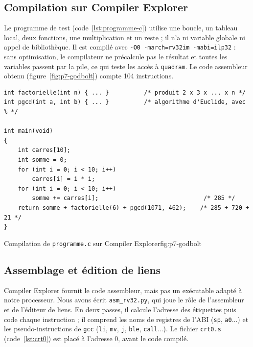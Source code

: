 \subsection{Compilation sur Compiler Explorer}

Le programme de test (code~\ref{lst:programme-c}) utilise une boucle, un tableau local, deux
fonctions, une multiplication et un reste ; il n'a ni variable globale ni appel de
bibliothèque. Il est compilé avec \texttt{-O0 -march=rv32im -mabi=ilp32} : sans
optimisation, le compilateur ne précalcule pas le résultat et toutes les variables passent
par la pile, ce qui teste les accès à \texttt{quadram}. Le code assembleur obtenu
(figure~\ref{fig:p7-godbolt}) compte 104 instructions.

\noindent\begin{minipage}{\linewidth}
\begin{lstlisting}[style=code, caption={Programme C de test (\texttt{programme.c}, extrait)}, label={lst:programme-c}]
int factorielle(int n) { ... }          /* produit 2 x 3 x ... x n */
int pgcd(int a, int b) { ... }          /* algorithme d'Euclide, avec % */

int main(void)
{
    int carres[10];
    int somme = 0;
    for (int i = 0; i < 10; i++)
        carres[i] = i * i;
    for (int i = 0; i < 10; i++)
        somme += carres[i];                              /* 285 */
    return somme + factorielle(6) + pgcd(1071, 462);    /* 285 + 720 + 21 */
}
\end{lstlisting}
\end{minipage}\par

{Compilation de \texttt{programme.c} sur Compiler Explorer}{fig:p7-godbolt}

\subsection{Assemblage et édition de liens}

Compiler Explorer fournit le code assembleur, mais pas un exécutable adapté à notre
processeur. Nous avons écrit \texttt{asm\_rv32.py}, qui joue le rôle de l'assembleur et de
l'éditeur de liens. En deux passes, il calcule l'adresse des étiquettes puis code chaque
instruction ; il comprend les noms de registres de l'ABI (\texttt{sp}, \texttt{a0}...) et
les pseudo-instructions de \texttt{gcc} (\texttt{li}, \texttt{mv}, \texttt{j}, \texttt{ble},
\texttt{call}...). Le fichier \texttt{crt0.s} (code~\ref{lst:crt0}) est placé à l'adresse 0,
avant le code compilé.

